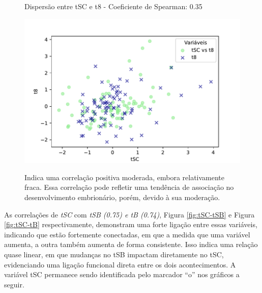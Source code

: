 \begin{figure}[h]
\begin{minipage}[b]{0.45\linewidth}
        \caption{Dispersão entre tSC e t8 - Coeficiente de Spearman: 0.35}
        \label{fig:tSC-t8}
        \centering
        \includegraphics[scale=0.35]{figuras/Spearman/tSC-t8.pdf}
        \vspace{0.3cm}
        \caption{Indica uma correlação positiva moderada, embora relativamente fraca. Essa correlação pode refletir uma tendência de associação no desenvolvimento embrionário, porém, devido à sua moderação.}
        \begin{minipage}{\linewidth}
            \centering
        \end{minipage}
    \end{minipage}
\end{figure}
\FloatBarrier

As correlações de \textit{tSC} com \textit{tSB (0.75) e tB (0.74)}, Figura \ref{fig:tSC-tSB} e Figura \ref{fig:tSC-tB} respectivamente, demonstram uma forte ligação entre essas variáveis, indicando que estão fortemente conectadas, em que a medida que uma variável aumenta, a outra também aumenta de forma consistente. Isso indica uma relação quase linear, em que mudanças no tSB impactam diretamente no tSC, evidenciando uma ligação funcional direta entre os dois acontecimentos. A variável tSC permanece sendo identificada pelo marcador “o” nos gráficos a seguir.

